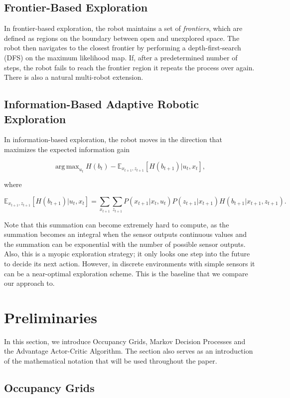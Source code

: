 \documentclass{article}
\DeclareMathOperator*{\argmax}{arg\,max}
\begin{document}
\subsection{Frontier-Based Exploration}

In frontier-based exploration, the robot maintains a set of \emph{frontiers}, which are defined as regions on the boundary between open and unexplored space. The robot then navigates to the closest frontier by performing a depth-first-search (DFS) on the maximum likelihood map. If, after a predetermined number of steps, the robot fails to reach the frontier region it repeats the process over again. There is also a natural multi-robot extension\cite{yamauchi1998frontier}.

\subsection{Information-Based Adaptive Robotic Exploration}
\label{sec:igain}

In information-based exploration, the robot moves in the direction that maximizes the expected information gain

$$
\argmax_{u_t} H(b_t) - \mathbb{E}_{x_{t+1}, z_{t+1}}[H(b_{t+1})|u_t, x_t],
$$

where

$$\mathbb{E}_{x_{t+1}, z_{t+1}}[H(b_{t+1})|u_t, x_t] = \sum_{x_{t+1}} \sum_{z_{t+1}} P(x_{t+1}|x_t, u_t) P(z_{t+1}|x_{t+1}) H(b_{t+1}|x_{t+1}, z_{t+1}).$$

Note that this summation can become extremely hard to compute, as the summation becomes an integral when the sensor outputs continuous values and the summation can be exponential with the number of possible sensor outputs. Also, this is a myopic exploration strategy; it only looks one step into the future to decide its next action. However, in discrete environments with simple sensors it can be a near-optimal exploration scheme. This is the baseline that we compare our approach to.

\section{Preliminaries}

In this section, we introduce Occupancy Grids, Markov Decision Processes and the Advantage Actor-Critic Algorithm. The section also serves as an introduction of the mathematical notation that will be used throughout the paper.

\subsection{Occupancy Grids}
\end{document}
